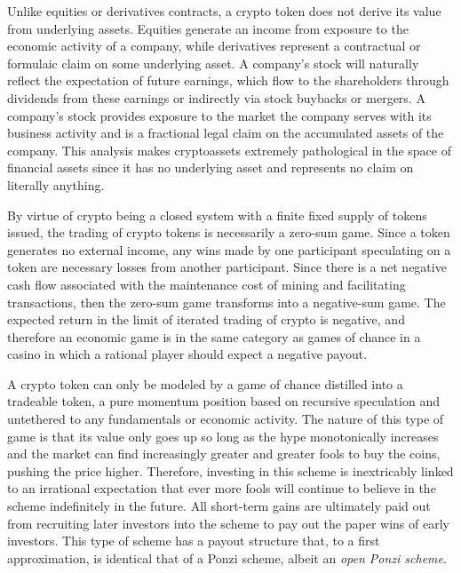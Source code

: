 Unlike equities or derivatives contracts, a crypto token does not derive its
value from underlying assets. Equities generate an income from exposure to the
economic activity of a company, while derivatives represent a contractual or
formulaic claim on some underlying asset. A company's stock will naturally
reflect the expectation of future earnings, which flow to the shareholders
through dividends from these earnings or indirectly via stock buybacks or
mergers. A company's stock provides exposure to the market the company serves
with its business activity and is a fractional legal claim on the accumulated
assets of the company. This analysis makes cryptoassets extremely pathological
in the space of financial assets since it has no underlying asset and represents
no claim on literally anything.

By virtue of crypto being a closed system with a finite fixed supply of tokens
issued, the trading of crypto tokens is necessarily a zero-sum game. Since a
token generates no external income, any wins made by one participant speculating
on a token are necessary losses from another participant. Since there is a net
negative cash flow associated with the maintenance cost of mining and
facilitating transactions, then the zero-sum game transforms into a negative-sum
game. The expected return in the limit of iterated trading of crypto is
negative, and therefore an economic game is in the same category as games of
chance in a casino in which a rational player should expect a negative payout.

A crypto token can only be modeled by a game of chance distilled into a
tradeable token, a pure momentum position based on recursive speculation and
untethered to any fundamentals or economic activity. The nature of this type of
game is that its value only goes up so long as the hype monotonically increases
and the market can find increasingly greater and greater fools to buy the coins,
pushing the price higher. Therefore, investing in this scheme is inextricably
linked to an irrational expectation that ever more fools will continue to
believe in the scheme indefinitely in the future. All short-term gains are
ultimately paid out from recruiting later investors into the scheme to pay out
the paper wins of early investors. This type of scheme has a payout structure
that, to a first approximation, is identical that of a Ponzi scheme, albeit an
\textit{open Ponzi scheme}.

